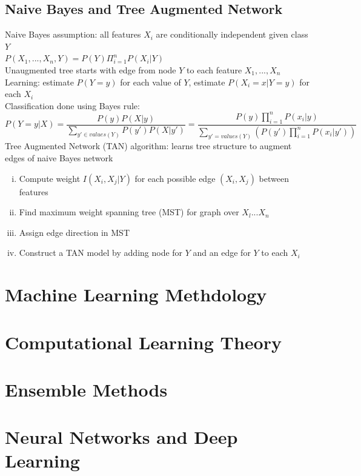 \documentclass{article}
\begin{document}
		\subsection{Naive Bayes and Tree Augmented Network}
			Naive Bayes assumption: all features $X_i$ are conditionally independent given class $Y$ \\
			$P(X_1, ..., X_n, Y) = P(Y)\Pi_{i = 1}^nP(X_i|Y)$ \\
			Unaugmented tree starts with edge from node $Y$ to each feature $X_1, ..., X_n$
			\\
			Learning: estimate $P(Y = y)$ for each value of $Y$, estimate $P(X_i = x|Y = y)$ for each $X_i$ \\
			Classification done using Bayes rule: 
			\begin{equation*}
				P(Y = y|X) = \frac{P(y)P(X|y)}{\sum\limits_{y' \in values(Y)}P(y')P(X|y')} = \frac{P(y)\prod\limits_{i = 1}^n P(x_i|y)}{\sum\limits_{y' = values(Y)}(P(y')\prod\limits_{i = 1}^n P(x_i|y'))}
				\end{equation*}
			Tree Augmented Network (TAN) algorithm: learns tree structure to augment edges of naive Bayes network
			\begin{enumerate}[(i)]
				\item Compute weight $I(X_i, X_j|Y)$ for each possible edge $(X_i, X_j)$ between features
				\item Find maximum weight spanning tree (MST) for graph over $X_l ... X_n$
				\item Assign edge direction in MST
				\item Construct a TAN model by adding node for $Y$ and an edge for $Y$ to each $X_i$
				\end{enumerate}
		\clearpage

	\section{Machine Learning Methdology}
		\clearpage

	\section{Computational Learning Theory}
		\clearpage

	\section{Ensemble Methods}
		\clearpage

	\section{Neural Networks and Deep Learning}
		\clearpage
\end{document}
